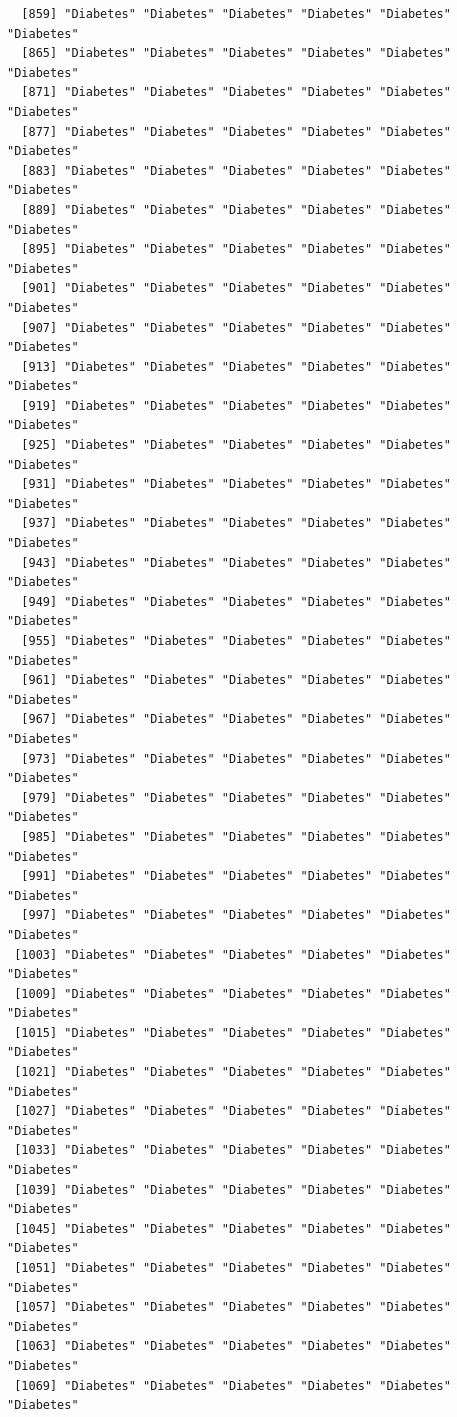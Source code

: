 \documentclass[
  letterpaper,
  DIV=11,
  numbers=noendperiod]{scrartcl}
\begin{document}
\begin{verbatim}
  [859] "Diabetes" "Diabetes" "Diabetes" "Diabetes" "Diabetes" "Diabetes"
  [865] "Diabetes" "Diabetes" "Diabetes" "Diabetes" "Diabetes" "Diabetes"
  [871] "Diabetes" "Diabetes" "Diabetes" "Diabetes" "Diabetes" "Diabetes"
  [877] "Diabetes" "Diabetes" "Diabetes" "Diabetes" "Diabetes" "Diabetes"
  [883] "Diabetes" "Diabetes" "Diabetes" "Diabetes" "Diabetes" "Diabetes"
  [889] "Diabetes" "Diabetes" "Diabetes" "Diabetes" "Diabetes" "Diabetes"
  [895] "Diabetes" "Diabetes" "Diabetes" "Diabetes" "Diabetes" "Diabetes"
  [901] "Diabetes" "Diabetes" "Diabetes" "Diabetes" "Diabetes" "Diabetes"
  [907] "Diabetes" "Diabetes" "Diabetes" "Diabetes" "Diabetes" "Diabetes"
  [913] "Diabetes" "Diabetes" "Diabetes" "Diabetes" "Diabetes" "Diabetes"
  [919] "Diabetes" "Diabetes" "Diabetes" "Diabetes" "Diabetes" "Diabetes"
  [925] "Diabetes" "Diabetes" "Diabetes" "Diabetes" "Diabetes" "Diabetes"
  [931] "Diabetes" "Diabetes" "Diabetes" "Diabetes" "Diabetes" "Diabetes"
  [937] "Diabetes" "Diabetes" "Diabetes" "Diabetes" "Diabetes" "Diabetes"
  [943] "Diabetes" "Diabetes" "Diabetes" "Diabetes" "Diabetes" "Diabetes"
  [949] "Diabetes" "Diabetes" "Diabetes" "Diabetes" "Diabetes" "Diabetes"
  [955] "Diabetes" "Diabetes" "Diabetes" "Diabetes" "Diabetes" "Diabetes"
  [961] "Diabetes" "Diabetes" "Diabetes" "Diabetes" "Diabetes" "Diabetes"
  [967] "Diabetes" "Diabetes" "Diabetes" "Diabetes" "Diabetes" "Diabetes"
  [973] "Diabetes" "Diabetes" "Diabetes" "Diabetes" "Diabetes" "Diabetes"
  [979] "Diabetes" "Diabetes" "Diabetes" "Diabetes" "Diabetes" "Diabetes"
  [985] "Diabetes" "Diabetes" "Diabetes" "Diabetes" "Diabetes" "Diabetes"
  [991] "Diabetes" "Diabetes" "Diabetes" "Diabetes" "Diabetes" "Diabetes"
  [997] "Diabetes" "Diabetes" "Diabetes" "Diabetes" "Diabetes" "Diabetes"
 [1003] "Diabetes" "Diabetes" "Diabetes" "Diabetes" "Diabetes" "Diabetes"
 [1009] "Diabetes" "Diabetes" "Diabetes" "Diabetes" "Diabetes" "Diabetes"
 [1015] "Diabetes" "Diabetes" "Diabetes" "Diabetes" "Diabetes" "Diabetes"
 [1021] "Diabetes" "Diabetes" "Diabetes" "Diabetes" "Diabetes" "Diabetes"
 [1027] "Diabetes" "Diabetes" "Diabetes" "Diabetes" "Diabetes" "Diabetes"
 [1033] "Diabetes" "Diabetes" "Diabetes" "Diabetes" "Diabetes" "Diabetes"
 [1039] "Diabetes" "Diabetes" "Diabetes" "Diabetes" "Diabetes" "Diabetes"
 [1045] "Diabetes" "Diabetes" "Diabetes" "Diabetes" "Diabetes" "Diabetes"
 [1051] "Diabetes" "Diabetes" "Diabetes" "Diabetes" "Diabetes" "Diabetes"
 [1057] "Diabetes" "Diabetes" "Diabetes" "Diabetes" "Diabetes" "Diabetes"
 [1063] "Diabetes" "Diabetes" "Diabetes" "Diabetes" "Diabetes" "Diabetes"
 [1069] "Diabetes" "Diabetes" "Diabetes" "Diabetes" "Diabetes" "Diabetes"

\end{verbatim}
\end{document}
